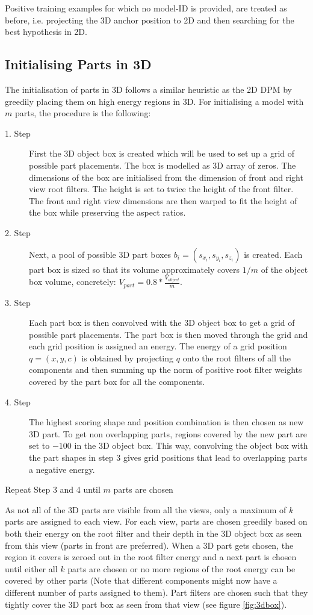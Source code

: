 Positive training examples for which no model-ID is provided, are treated as before, i.e. projecting the 3D anchor position to 2D and then searching for the best hypothesis in 2D. 

\subsection{Initialising Parts in 3D}\label{sec:partInit}

The initialisation of parts in 3D follows a similar heuristic as the 2D DPM by greedily placing them on high energy regions in 3D. For initialising a model with $m$ parts, the procedure is the following:  \begin{description}
  \item[1. Step] First the 3D object box is created which will be used to set up a grid of possible part placements. The box is modelled as 3D array of zeros. The dimensions of the box are initialised from the dimension of front and right view root filters. The height is set to twice the height of the front filter. The front and right view dimensions are then warped to fit the height of the box while preserving the aspect ratios. 
  \item[2. Step] Next, a pool of possible 3D part boxes $b_i=(s_{x_i},s_{y_i},s_{z_i})$ is created. Each part box is sized so that its volume approximately covers $1/m$ of the object box volume, concretely: $V_{part}=0.8*\frac{V_{object}}{m}$. 
  \item[3. Step] Each part box is then convolved with the 3D object box to get a grid of possible part placements. The part box is then moved through the grid and each grid position is assigned an energy. The energy of a grid position $q=(x,y,c)$ is obtained by projecting $q$ onto the root filters of all the components and then summing up the norm of positive root filter weights covered by the part box for all the components.
  \item[4. Step] The highest scoring shape and position combination is then chosen as new 3D part. To get non overlapping parts, regions covered by the new part are set to $-100$ in the 3D object box. This way, convolving the object box with the part shapes in step 3 gives grid positions that lead to overlapping parts a negative energy.
  \item[Repeat Step 3 and 4 until $m$ parts are chosen] 
\end{description}

As not all of the 3D parts are visible from all the views, only a maximum of $k$ parts are assigned to each view. For each view, parts are chosen greedily based on both their energy on the root filter and their depth in the 3D object box as seen from this view (parts in front are preferred). When a 3D part gets chosen, the region it covers is zeroed out in the root filter energy and a next part is chosen until either all $k$ parts are chosen or no more regions of the root energy can be covered by other parts (Note that different components might now have a different number of parts assigned to them). Part filters are chosen such that they tightly cover the 3D part box as seen from that view (see figure \ref{fig:3dbox}).

